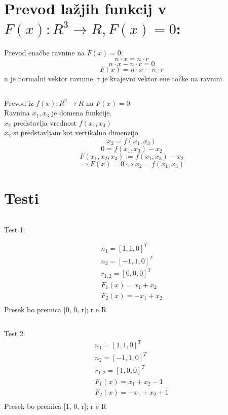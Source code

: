 \documentclass[12pt, letterpaper, twoside]{article}    %
\begin{document}
\newpage

\section{Prevod lažjih funkcij v \\ $F(x) : R^3 \rightarrow R, F(x) = 0$:}

Prevod enačbe ravnine na $F(x)=0$: \\
$$n \cdot x = n \cdot r$$
$$n \cdot x - n \cdot r = 0$$
$$F(x) = n \cdot x - n \cdot r$$
n je normalni vektor ravnine, r je krajevni vektor ene točke na ravnini.

$$$$

Prevod iz $f(x) : R^2 \rightarrow R$ na $F(x)=0$: \\
Ravnina $x_1, x_3$ je domena funkcije. \\
$x_2$ predstavlja vrednost $f(x_1, x_3)$ \\
$x_2$ si predstavljam kot vertikalno dimenzijo. \\
$$x_2 = f(x_1, x_3)$$
$$0 = f(x_1, x_3) - x_2$$
$$F(x_1, x_2, x_3) := f(x_1, x_3) - x_2$$
$$ \Rightarrow F(x) = 0 \Leftrightarrow x_2 = f(x_1, x_3)$$

\newpage

\section{Testi}

$$$$

Test 1:

\begin{equation}
\begin{split}
n_1 = [1, 1, 0]^T \\
n_2 = [-1, 1, 0]^T \\
r_{1, 2} = [0, 0, 0]^T \\
F_1(x) = x_1 + x_2 \\
F_2(x) = -x_1 + x_2 \\
\end{split}
\end{equation}
Presek bo premica [0, 0, r]; r e R

$$$$

Test 2:
\begin{equation}
\begin{split}
n_1 = [1, 1, 0]^T \\
n_2 = [-1, 1, 0]^T \\
r_{1, 2} = [1, 0, 0]^T \\
F_1(x) = x_1 + x_2 - 1 \\
F_2(x) = -x_1 + x_2 + 1\\
\end{split}
\end{equation}
Presek bo premica [1, 0, r]; r e R
\end{document}
